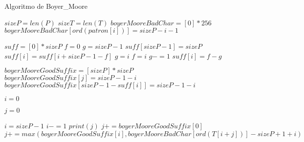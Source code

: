 \begin{algorithm} [H]
    \caption{Algoritmo de Boyer\_Moore}\label{alg:BM}
    \begin{algorithmic} [1]
            \State $sizeP = len(P)$
            \State $sizeT = len(T)$
            \State $boyerMooreBadChar = [0] * 256$ 
                \State $boyerMooreBadChar[ord(patron[i])] = sizeP - i - 1$
            \EndFor
            
            \State $suff = [0] * sizeP$
            \State $f = 0$
            \State $g = sizeP -1$
            \State $suff[sizeP -1] = sizeP$
                    \State $suff[i] = suff[i + sizeP -1 -f]$
                \Else
                        \State $g = i$
                    \EndIf
                    \State $f = i$
                        \State $g -= 1$
                    \EndWhile
                    \State $suff[i] = f - g$
                \EndIf
            \EndFor

            \State $boyerMooreGoodSuffix = [sizeP] * sizeP$
                            \State $boyerMooreGoodSuffix[j] = sizeP - 1 - i$
                        \EndIf
                    \EndFor
                \EndIf
            \EndFor
                \State $boyerMooreGoodSuffix[sizeP - 1 - suff[i]] = sizeP - 1 - i$
            \EndFor

            \State $i = 0$
    \end{algorithmic}
\end{algorithm}

\begin{algorithm} [H]
    \begin{algorithmic} [1]
                \State $j = 0$

                \State $i = sizeP - 1$
                    \State $i -= 1$
                \EndWhile
                    \State $print(j)$
                    \State $j += boyerMooreGoodSuffix[0]$
                \Else
                    \State $j += max(boyerMooreGoodSuffix[i], boyerMooreBadChar[ord(T[i+j])] - sizeP + 1 + i)$
                \EndIf
            \EndWhile
        \EndProcedure
    \end{algorithmic}
\end{algorithm}

